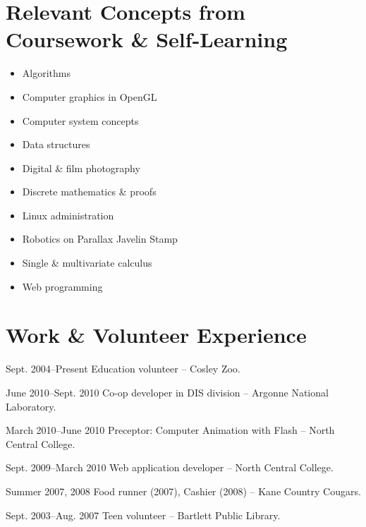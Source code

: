 \documentclass[12pt]{simplecv}
\begin{document}
  \section{Relevant Concepts from Coursework \& Self-Learning}
  \begin{multicols}{2}
    \begin{itemize}
      \item Algorithms
      \item Computer graphics in OpenGL
      \item Computer system concepts
      \item Data structures
      \item Digital \& film photography
      \item Discrete mathematics \& proofs
      \item Linux administration
      \item Robotics on Parallax Javelin Stamp
      \item Single \& multivariate calculus
      \item Web programming
    \end{itemize}
  \end{multicols}

  \section{Work \& Volunteer Experience}
  \begin{topic}
    \item[Sept. 2004--Present] Education volunteer -- Cosley Zoo.
    \item[June 2010--Sept. 2010] Co-op developer in DIS division -- Argonne National Laboratory.
    \item[March 2010--June 2010] Preceptor: Computer Animation with Flash -- North Central College.
    \item[Sept. 2009--March 2010] Web application developer -- North Central College.
    \item[Summer 2007, 2008] Food runner (2007), Cashier (2008) -- Kane Country Cougars.
    \item[Sept. 2003--Aug. 2007] Teen volunteer -- Bartlett Public Library.
  \end{topic}
\end{document}
